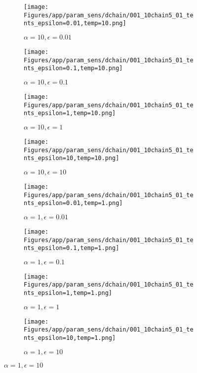 \documentclass{article}
\theoremstyle{plain}
\begin{document}
\begin{appendices}
\begin{figure}
                \begin{subfigure}[b]{0.24\textwidth}
                    \centering
                    \texttt{[image: Figures/app/param\_sens/dchain/001\_10chain5\_01\_tents\_epsilon=0.01,temp=10.png]}
                    \caption*{$\alpha=10,\epsilon=0.01$}
                \end{subfigure}
                \begin{subfigure}[b]{0.24\textwidth}
                    \centering
                    \texttt{[image: Figures/app/param\_sens/dchain/001\_10chain5\_01\_tents\_epsilon=0.1,temp=10.png]}
                    \caption*{$\alpha=10,\epsilon=0.1$}
                \end{subfigure}
                \begin{subfigure}[b]{0.24\textwidth}
                    \centering
                    \texttt{[image: Figures/app/param\_sens/dchain/001\_10chain5\_01\_tents\_epsilon=1,temp=10.png]}
                    \caption*{$\alpha=10,\epsilon=1$}
                \end{subfigure}
                \begin{subfigure}[b]{0.24\textwidth}
                    \centering
                    \texttt{[image: Figures/app/param\_sens/dchain/001\_10chain5\_01\_tents\_epsilon=10,temp=10.png]}
                    \caption*{$\alpha=10,\epsilon=10$}
                \end{subfigure}
                
                \begin{subfigure}[b]{0.24\textwidth}
                    \centering
                    \texttt{[image: Figures/app/param\_sens/dchain/001\_10chain5\_01\_tents\_epsilon=0.01,temp=1.png]}
                    \caption*{$\alpha=1,\epsilon=0.01$}
                \end{subfigure}
                \begin{subfigure}[b]{0.24\textwidth}
                    \centering
                    \texttt{[image: Figures/app/param\_sens/dchain/001\_10chain5\_01\_tents\_epsilon=0.1,temp=1.png]}
                    \caption*{$\alpha=1,\epsilon=0.1$}
                \end{subfigure}
                \begin{subfigure}[b]{0.24\textwidth}
                    \centering
                    \texttt{[image: Figures/app/param\_sens/dchain/001\_10chain5\_01\_tents\_epsilon=1,temp=1.png]}
                    \caption*{$\alpha=1,\epsilon=1$}
                \end{subfigure}
                \begin{subfigure}[b]{0.24\textwidth}
                    \centering
                    \texttt{[image: Figures/app/param\_sens/dchain/001\_10chain5\_01\_tents\_epsilon=10,temp=1.png]}
                    \caption*{$\alpha=1,\epsilon=10$}
                \end{subfigure}
                

\end{figure}
\end{appendices}
\end{document}
